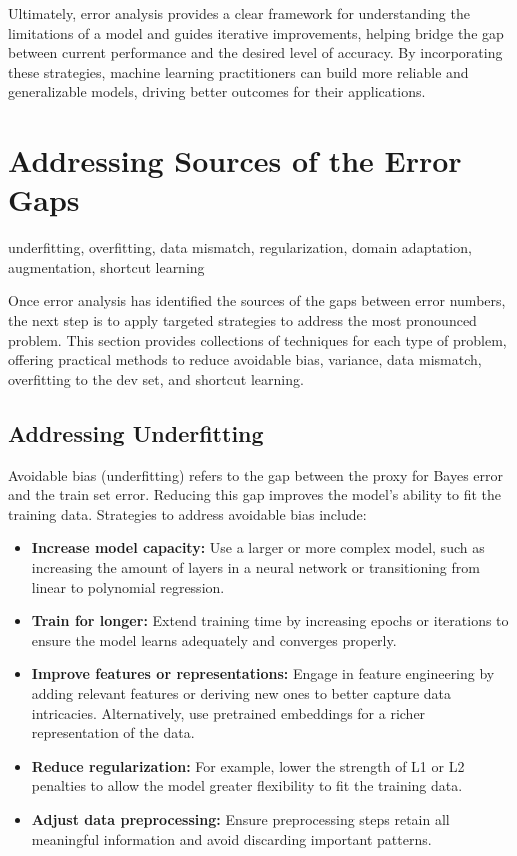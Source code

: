 \documentclass[12pt,openany]{book}
\begin{document}
Ultimately, error analysis provides a clear framework for understanding the limitations of a model and guides iterative improvements, helping bridge the gap between current performance and the desired level of accuracy. By incorporating these strategies, machine learning practitioners can build more reliable and generalizable models, driving better outcomes for their applications.



\section{Addressing Sources of the Error Gaps} \label{sec:addressing_sources_error_gaps}

\begin{keywordsbox}
underfitting, overfitting, data mismatch, regularization, domain adaptation, augmentation, shortcut learning
\end{keywordsbox}

Once error analysis has identified the sources of the gaps between error numbers, the next step is to apply targeted strategies to address the most pronounced problem. This section provides collections of techniques for each type of problem, offering practical methods to reduce avoidable bias, variance, data mismatch, overfitting to the dev set, and shortcut learning.

\subsection{Addressing Underfitting}

Avoidable bias (underfitting) refers to the gap between the proxy for Bayes error and the train set error. Reducing this gap improves the model’s ability to fit the training data. Strategies to address avoidable bias include:

\begin{itemize}
    \item \textbf{Increase model capacity:} Use a larger or more complex model, such as increasing the amount of layers in a neural network or transitioning from linear to polynomial regression.
    \item \textbf{Train for longer:} Extend training time by increasing epochs or iterations to ensure the model learns adequately and converges properly.
    \item \textbf{Improve features or representations:} Engage in feature engineering by adding relevant features or deriving new ones to better capture data intricacies. Alternatively, use pretrained embeddings for a richer representation of the data.
    \item \textbf{Reduce regularization:} For example, lower the strength of L1 or L2 penalties to allow the model greater flexibility to fit the training data.
    \item \textbf{Adjust data preprocessing:} Ensure preprocessing steps retain all meaningful information and avoid discarding important patterns.
\end{itemize}
\end{document}
